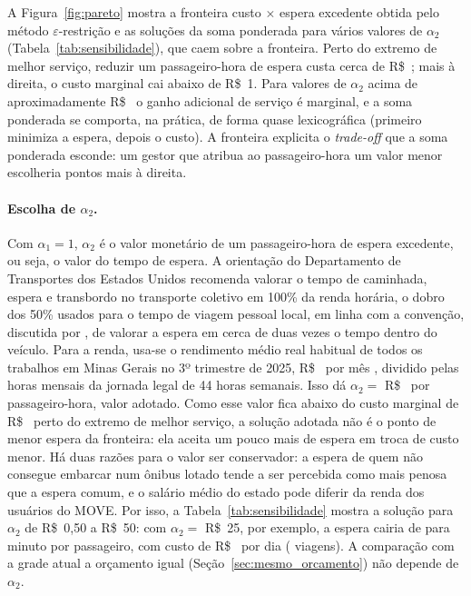 \documentclass[11pt,a4paper]{article}
\begin{document}
A Figura~\ref{fig:pareto} mostra a fronteira custo $\times$ espera excedente obtida pelo
método $\varepsilon$-restrição e as soluções da soma ponderada para vários
valores de $\alpha_2$ (Tabela~\ref{tab:sensibilidade}), que caem sobre a
fronteira. Perto do extremo de melhor serviço, reduzir um passageiro-hora de
espera custa cerca de R\$~\custoMarginalPareto; mais à direita, o custo marginal
cai abaixo de R\$~1. Para valores de $\alpha_2$ acima de aproximadamente
R\$~\custoMarginalPareto{} o ganho adicional de serviço é marginal, e a soma
ponderada se comporta, na prática, de forma quase lexicográfica (primeiro
minimiza a espera, depois o custo). A fronteira explicita o \emph{trade-off} que
a soma ponderada esconde: um gestor que atribua ao passageiro-hora um valor
menor escolheria pontos mais à direita.

\paragraph{Escolha de $\alpha_2$.} Com $\alpha_1=1$, $\alpha_2$ é o valor
monetário de um passageiro-hora de espera excedente, ou seja, o valor do tempo
de espera. A orientação do Departamento de Transportes dos Estados Unidos
\citep{usdot2003} recomenda valorar o tempo de caminhada, espera e transbordo no
transporte coletivo em 100\% da renda horária, o dobro dos 50\% usados para o
tempo de viagem pessoal local, em linha com a convenção, discutida por
\citet{wardman2004}, de valorar a espera em cerca de duas vezes o tempo dentro do
veículo. Para a renda, usa-se o rendimento médio real habitual de todos os
trabalhos em Minas Gerais no 3º trimestre de 2025, R\$~\rendaMG{} por mês
\citep{ibge2025}, dividido pelas \horasMes{} horas mensais da jornada legal de
44 horas semanais. Isso dá $\alpha_2=$ R\$~\alfaDois{} por passageiro-hora,
valor adotado. Como esse valor fica abaixo do custo marginal de
R\$~\custoMarginalPareto{} perto do extremo de melhor serviço, a solução adotada
não é o ponto de menor espera da fronteira: ela aceita um pouco mais de espera
em troca de custo menor. Há duas razões para o valor ser conservador: a espera
de quem não consegue embarcar num ônibus lotado tende a ser percebida como mais
penosa que a espera comum, e o salário médio do estado pode diferir da renda dos
usuários do MOVE. Por isso, a Tabela~\ref{tab:sensibilidade} mostra a solução
para $\alpha_2$ de R\$~0{,}50 a R\$~50: com $\alpha_2=$ R\$~25, por exemplo, a
espera cairia de \esperaMin{} para \esperaAlfaVinteCinco{} minuto por passageiro,
com custo de R\$~\custoAlfaVinteCinco{} por dia (\viagensAlfaVinteCinco{}
viagens). A comparação com a grade atual a orçamento igual
(Seção~\ref{sec:mesmo_orcamento}) não depende de $\alpha_2$.
\end{document}
